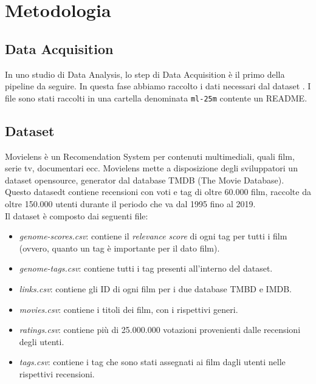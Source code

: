 \documentclass[../../Report.tex]{subfiles}
\begin{document}
\chapter{Metodologia}

\section{Data Acquisition}
In uno studio di Data Analysis, lo step di Data Acquisition è il primo della pipeline da seguire.
In questa fase abbiamo raccolto i dati necessari dal dataset \cite[MovieLens]{movielens}.
I file sono stati raccolti in una cartella denominata \texttt{ml-25m} contente un README.


\section{Dataset}
\label{dataset}

Movielens è un Recomendation System per contenuti multimediali, quali film, serie tv, documentari ecc.
Movielens mette a disposizione degli sviluppatori un dataset opensource, generator dal database TMDB (The Movie Database).
Questo datasedt contiene recensioni con voti e tag di oltre 60.000 film, raccolte da oltre 150.000 utenti durante il periodo che va dal 1995 fino al 2019.
\\
Il dataset è composto dai seguenti file:
\begin{itemize}
    \item \textit{genome-scores.csv}: contiene il \textit{relevance score} di ogni tag per tutti i film (ovvero, quanto un tag è importante per il dato film).
    \item \textit{genome-tags.csv}: contiene tutti i tag presenti all'interno del dataset.
    \item \textit{links.csv}: contiene gli ID di ogni film per i due database TMBD e IMDB.
    \item \textit{movies.csv}: contiene i titoli dei film, con i rispettivi generi.
    \item \textit{ratings.csv}: contiene più di 25.000.000 votazioni provenienti dalle recensioni degli utenti.
    \item \textit{tags.csv}: contiene i tag che sono stati assegnati ai film dagli utenti nelle rispettivi recensioni.
\end{itemize}
\end{document}
